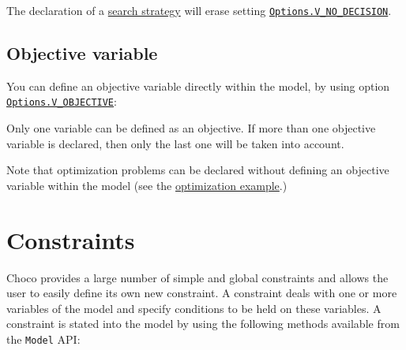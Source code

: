 \begin{note}
 The declaration of a \hyperlink{solver:searchstrategy}{search strategy} will erase setting \hyperlink{vnodecision:vnodecisionoptions}{\tt Options.V\_NO\_DECISION}.
\end{note}

\subsection{Objective variable}\label{model:objectivevariable}\hypertarget{model:objectivevariable}{}
You can define an objective variable directly within the model, by using option \hyperlink{vobjective:vobjectiveoptions}{\tt Options.V\_OBJECTIVE}:


Only one variable can be defined as an objective. If more than one objective variable is declared, then only the last one will be taken into account.

Note that optimization problems can be declared without defining an objective variable within the model (see the \hyperlink{solver:optimization}{optimization example}.)


\section{Constraints}\label{model:constraints}\hypertarget{model:constraints}{}
Choco provides a large number of simple and global constraints and allows the user to easily define its own new constraint.
A constraint deals with one or more variables of the model and specify conditions to be held on these variables. 
A constraint is stated into the model by using the following methods available from the \texttt{Model} API: 

